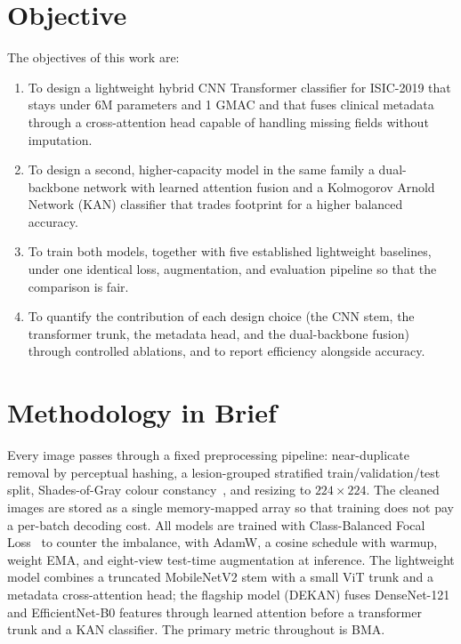 \section{Objective}

The objectives of this work are:

\begin{enumerate}
  \item To design a lightweight hybrid CNN Transformer classifier for
        ISIC-2019 that stays under 6M parameters and 1 GMAC and that fuses
        clinical metadata through a cross-attention head capable of handling
        missing fields without imputation.
  \item To design a second, higher-capacity model in the same family a
        dual-backbone network with learned attention fusion and a
        Kolmogorov Arnold Network (KAN) classifier that trades footprint
        for a higher balanced accuracy.
  \item To train both models, together with five established lightweight
        baselines, under one identical loss, augmentation, and evaluation
        pipeline so that the comparison is fair.
  \item To quantify the contribution of each design choice (the CNN stem, the
        transformer trunk, the metadata head, and the dual-backbone fusion)
        through controlled ablations, and to report efficiency alongside
        accuracy.
\end{enumerate}

\section{Methodology in Brief}

Every image passes through a fixed preprocessing pipeline: near-duplicate
removal by perceptual hashing, a lesion-grouped stratified train/validation/test
split, Shades-of-Gray colour constancy~\cite{finlayson2004shadesofgray}, and
resizing to $224\times224$. The cleaned images are stored as a single memory-mapped
array so that training does not pay a per-batch decoding cost. All models are
trained with Class-Balanced Focal Loss~\cite{cui2019classbalanced,lin2017focal}
to counter the imbalance, with AdamW, a cosine schedule with warmup, weight
EMA, and eight-view test-time augmentation at inference. The lightweight model
combines a truncated MobileNetV2 stem with a small ViT trunk and a metadata
cross-attention head; the flagship model (DEKAN) fuses DenseNet-121 and
EfficientNet-B0 features through learned attention before a transformer trunk and
a KAN classifier. The primary metric throughout is BMA.

